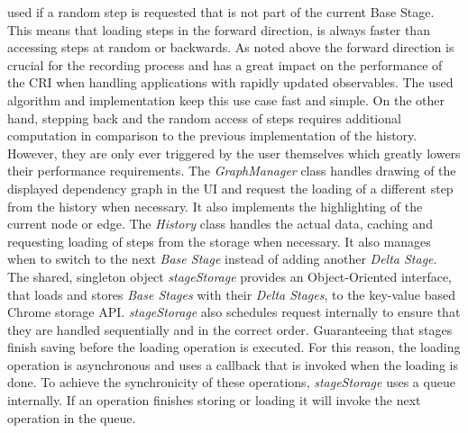 used if a random step is requested that is not part of the current Base Stage. This means that loading steps in the forward direction, is always faster than accessing steps at random or backwards. As noted above the forward direction is crucial for the recording process and has a great impact on the performance of the CRI when handling applications with rapidly updated observables. The used algorithm and implementation keep this use case fast and simple. On the other hand, stepping back and the random access of steps requires additional computation in comparison to the previous implementation of the history. However, they are only ever triggered by the user themselves which greatly lowers their performance requirements.
The \emph{GraphManager} class handles drawing of the displayed dependency graph in the UI and request the loading of a different step from the history when necessary. It also implements the highlighting of the current node or edge. The \emph{History} class handles the actual data, caching and requesting loading of steps from the storage when necessary. It also manages when to switch to the next \emph{Base Stage} instead of adding another \emph{Delta Stage}. The shared, singleton object \emph{stageStorage} provides an Object-Oriented interface, that loads and stores \emph{Base Stages} with their \emph{Delta Stages}, to the key-value based Chrome storage API. \emph{stageStorage} also schedules request internally to ensure that they are handled sequentially and in the correct order. Guaranteeing that stages finish saving before the loading operation is executed. For this reason, the loading operation is asynchronous and uses a callback that is invoked when the loading is done. To achieve the synchronicity of these operations, \emph{stageStorage} uses a queue internally. If an operation finishes storing or loading it will invoke the next operation in the queue.	
